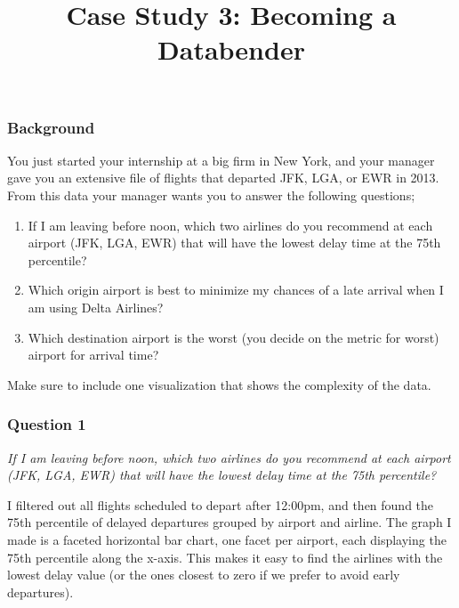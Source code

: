 \documentclass[]{article}
\title{Case Study 3: Becoming a Databender}
\author{}
\date{}
\begin{document}
\maketitle

\subsubsection{Background}\label{background}

You just started your internship at a big firm in New York, and your
manager gave you an extensive file of flights that departed JFK, LGA, or
EWR in 2013. From this data your manager wants you to answer the
following questions;

\begin{enumerate}
\def\labelenumi{\arabic{enumi})}
\item
  If I am leaving before noon, which two airlines do you recommend at
  each airport (JFK, LGA, EWR) that will have the lowest delay time at
  the 75th percentile?
\item
  Which origin airport is best to minimize my chances of a late arrival
  when I am using Delta Airlines?
\item
  Which destination airport is the worst (you decide on the metric for
  worst) airport for arrival time?
\end{enumerate}

Make sure to include one visualization that shows the complexity of the
data.

\subsubsection{Question 1}\label{question-1}

\emph{If I am leaving before noon, which two airlines do you recommend
at each airport (JFK, LGA, EWR) that will have the lowest delay time at
the 75th percentile?}

I filtered out all flights scheduled to depart after 12:00pm, and then
found the 75th percentile of delayed departures grouped by airport and
airline. The graph I made is a faceted horizontal bar chart, one facet
per airport, each displaying the 75th percentile along the x-axis. This
makes it easy to find the airlines with the lowest delay value (or the
ones closest to zero if we prefer to avoid early departures).
\end{document}

